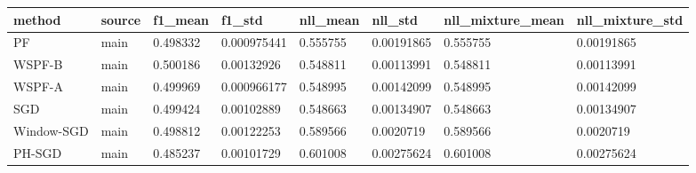 \begin{tabular}{llllllll}
\hline
method & source & f1\_mean & f1\_std & nll\_mean & nll\_std & nll\_mixture\_mean & nll\_mixture\_std \\
\hline
PF & main & 0.498332 & 0.000975441 & 0.555755 & 0.00191865 & 0.555755 & 0.00191865 \\
WSPF-B & main & 0.500186 & 0.00132926 & 0.548811 & 0.00113991 & 0.548811 & 0.00113991 \\
WSPF-A & main & 0.499969 & 0.000966177 & 0.548995 & 0.00142099 & 0.548995 & 0.00142099 \\
SGD & main & 0.499424 & 0.00102889 & 0.548663 & 0.00134907 & 0.548663 & 0.00134907 \\
Window-SGD & main & 0.498812 & 0.00122253 & 0.589566 & 0.0020719 & 0.589566 & 0.0020719 \\
PH-SGD & main & 0.485237 & 0.00101729 & 0.601008 & 0.00275624 & 0.601008 & 0.00275624 \\
\hline
\end{tabular}
